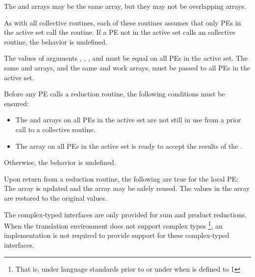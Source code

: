 \begin{apidefinition}
{    The \source{} and \dest{} arrays may be the same array, but they may not be
    overlapping arrays.

    As with all \openshmem collective routines, each of these routines assumes
    that only \acp{PE} in the active set call the routine.  If a \ac{PE} not in
    the active set calls an \openshmem collective routine, the behavior is undefined.

    The values of arguments , , , and
     must be equal on all \acp{PE} in the active set. The same \dest{}
    and \source{} arrays, and the same  and  work arrays, must
    be passed to all \acp{PE} in the active set.

    Before any \ac{PE} calls a reduction routine,
    the following conditions must be ensured:
    \begin{itemize}
    \item The  and  arrays on all \acp{PE} in the
      active set are not still in use from a prior call to a collective
      \openshmem routine.
    \item The \dest{} array on all \acp{PE} in the active set is ready
      to accept the results of the .
    \end{itemize}
    Otherwise, the behavior is undefined.

    Upon return from a reduction routine, the following are true for the local
    \ac{PE}: The \dest{} array is updated and the \source{} array may be safely reused.
    The values in the  array are
    restored to the original values.


    The complex-typed interfaces are only provided for sum and product reductions.
    When the \Cstd translation environment does not support complex types
    \footnote{That is, under \Cstd language standards prior to \Cstd[99] or under \Cstd[11]
    when  is defined to 1}, an \openshmem
    implementation is not required to provide support for these
    complex-typed interfaces.
}




\end{apidefinition}
